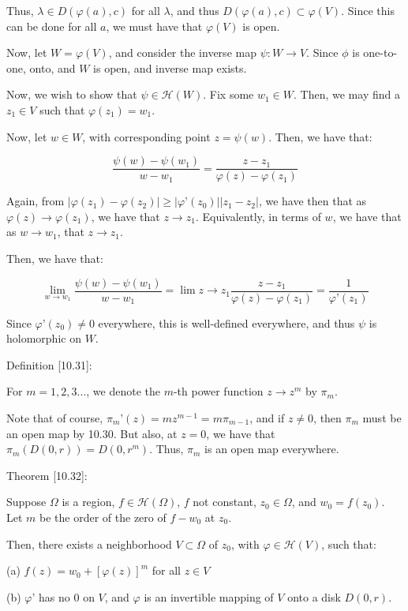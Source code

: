 \documentclass[10pt]{article}
\newcommand{\calH}{\mathcal{H}}
\begin{document}
Thus, $\lambda \in D(\varphi(a), c)$ for all $\lambda$, and thus $D(\varphi(a), c) \subset \varphi(V)$. Since this can be done for all $a$, we must have that $\varphi(V)$ is open. 

Now, let $W = \varphi(V)$, and consider the inverse map $\psi: W \to V$. Since $\phi$ is one-to-one, onto, and $W$ is open, and inverse map exists. 

Now, we wish to show that $\psi \in \calH(W)$. Fix some $w_1 \in W$. Then, we may find a $z_1 \in V$ such that $\varphi(z_1) = w_1$.

Now, let $w \in W$, with corresponding point $z = \psi(w)$. Then, we have that:

$$ \frac{\psi(w) - \psi(w_1)}{w - w_1} = \frac{z - z_1}{\varphi(z) - \varphi(z_1)}$$

Again, from $ | \varphi(z_1) - \varphi(z_2)| \geq | \varphi’(z_0)| | z_1 - z_2| $, we have then that as $\varphi(z) \to \varphi(z_1)$, we have that $z \to z_1$. Equivalently, in terms of $w$, we have that as $w \to w_1$, that $z \to z_1$. 

Then, we have that:

$$\lim_{w \to w_1} \frac{\psi(w) - \psi(w_1)}{w - w_1} = \lim{z \to z_1} \frac{z - z_1}{\varphi(z) - \varphi(z_1)} = \frac{1}{\varphi’(z_1)}$$

Since $\varphi’(z_0) \not = 0$ everywhere, this is well-defined everywhere, and thus $\psi$ is holomorphic on $W$.

Definition [10.31]:

For $m = 1,2,3...$, we denote the $m$-th power function $z \to z^m$ by $\pi_m$. 

Note that of course, $\pi_m’(z) = m z^{m-1} = m\pi_{m-1}$, and if $z \not = 0$, then $\pi_m$ must be an open map by 10.30. But also, at $z = 0$, we have that $\pi_m(D(0,r)) = D(0,r^m)$. Thus, $\pi_m$ is an open map everywhere.

Theorem [10.32]:

Suppose $\Omega$ is a region, $f \in \calH(\Omega)$, $f$ not constant, $z_0 \in \Omega$, and $w_0 = f(z_0)$. Let $m$ be the order of the zero of $f - w_0$ at $z_0$.

Then, there exists a neighborhood $V \subset \Omega$ of $z_0$, with $\varphi \in \calH(V)$, such that:

(a) $f(z) = w_0 + [\varphi(z)]^m$ for all $z \in V$

(b) $\varphi’$ has no 0 on $V$, and $\varphi$ is an invertible mapping of $V$ onto a disk $D(0,r)$.
\end{document}
